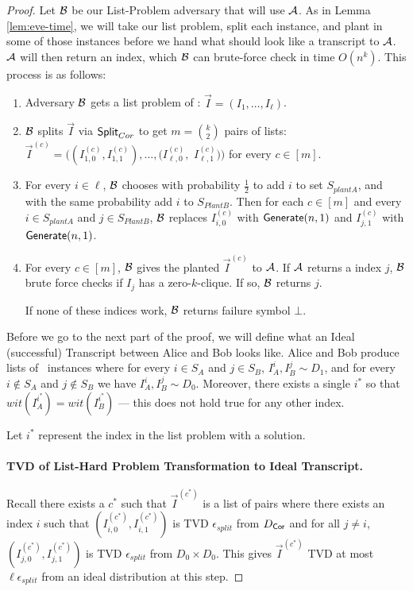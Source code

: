 \begin{proof}
	Let ${\cal B}$ be our List-Problem adversary that will use $\mathcal{A}$. As in Lemma \ref{lem:eve-time}, we will take our list problem, split each instance, and plant in some of those instances before we hand what should look like a transcript to $\mathcal{A}$. $\mathcal{A}$ will then return an index, which ${\cal B}$ can brute-force check in time $O(n^k)$. This process is as follows:
	\begin{enumerate}
		\item Adversary ${\cal B}$ gets a list problem of \zkclique: $\vec I = ( I_1, \ldots, I_\ell )$.
		\item ${\cal B}$ splits $\vec I$ via $\mathsf{Split}_{Cor}$ to get $m = \binom k 2$ pairs of lists: $\vec I^{(c)} = ( (I_{1,0}^{(c)}, I_{1,1}^{(c)}), \ldots,  (I_{\ell,0}^{(c)},$ $I_{\ell,1}^{(c)}))$ for every $c \in [m]$.
		\item For every $i \in \ell$, ${\cal B}$ chooses with probability $\frac 1 2$ to add $i$ to set $S_{plantA}$, and with the same probability add $i$ to $S_{PlantB}$.
		Then for each $c \in [m]$ and every $i \in S_{plantA}$ and $j \in S_{PlantB}$, ${\cal B}$ replaces $I_{i, 0}^{(c)}$ with $\mathsf{Generate}(n,1)$ and $I_{j, 1}^{(c)}$ with $\mathsf{Generate}(n,1)$.
		
		\item For every $c \in [m]$, ${\cal B}$ gives the planted $\vec I^{(c)}$ to $\mathcal{A}$. If $\mathcal{A}$ returns a index $j$, ${\cal B}$ brute force checks if $I_j$ has a zero-$k$-clique. If so, ${\cal B}$ returns $j$.
		
		If none of these indices work, ${\cal B}$ returns failure symbol $\bot$.
	\end{enumerate}
	
	Before we go to the next part of the proof, we will define what an Ideal (successful) Transcript between Alice and Bob looks like. Alice and Bob produce lists of \zkclique~instances where for every $i \in S_A$ and $j \in S_B$, $I_A^i, I_B^j \sim D_1$, and for every $i \not\in S_A$ and $j \not\in S_B$ we have $I_A^i, I_B^j \sim D_0$. Moreover, there exists a single $i^*$ so that $wit(I_A^{i^*}) = wit(I_B^{i^*})$ --- this does not hold true for any other index.
	
	Let $i^*$ represent the index in the list problem with a solution.
	
	\paragraph{TVD of List-Hard Problem Transformation to Ideal Transcript.}
	Recall there exists a $c^*$ such that $\vec I^{(c^*)}$ is a list of pairs where there exists an index $i$ such that $(I_{i,0}^{(c^*)}, I_{i,1}^{(c^*)})$ is TVD $\epsilon_{split}$ from $D_{\mathsf{Cor}}$ and for all $j \neq i$, $(I_{j,0}^{(c^*)}, I_{j,1}^{(c^*)})$ is TVD $\epsilon_{split}$ from $D_0\times D_0$. This gives $\vec I^{(c^*)}$ TVD at most $\ell \epsilon_{split}$ from an ideal distribution at this step.
	

\end{proof}
